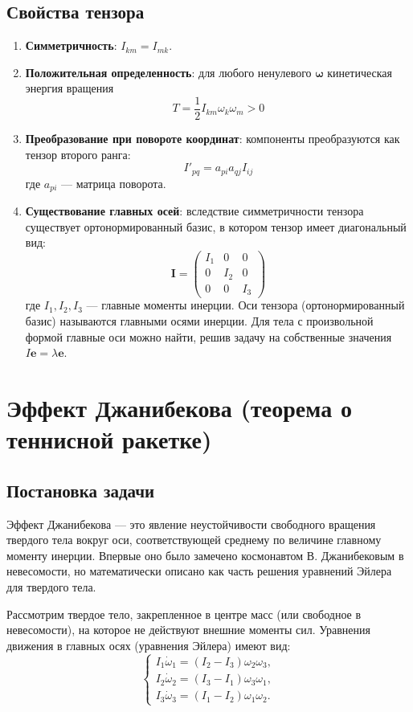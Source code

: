 \documentclass[12pt, a4paper]{article}
\begin{document}
\subsection{Свойства тензора}
\begin{enumerate}
    \item \textbf{Симметричность}: $I_{km} = I_{mk}$.
    \item \textbf{Положительная определенность}: для любого ненулевого $\boldsymbol{\omega}$ кинетическая энергия вращения 
    \[
    T = \frac{1}{2} I_{km} \omega_k \omega_m > 0
    \]
    \item \textbf{Преобразование при повороте координат}: компоненты преобразуются как тензор второго ранга:
    \[
    I'_{pq} = a_{pi} a_{qj} I_{ij}
    \]
    где $a_{pi}$ — матрица поворота.
    \item \textbf{Существование главных осей}: вследствие симметричности тензора существует ортонормированный базис, в котором тензор имеет диагональный вид:
    \[
    \mathbf{I} = \begin{pmatrix}
    I_1 & 0 & 0 \\
    0 & I_2 & 0 \\
    0 & 0 & I_3
    \end{pmatrix}
    \]
    где $I_1, I_2, I_3$ — главные моменты инерции. Оси тензора (ортонормированный базис) называются главными осями инерции. Для тела с произвольной формой главные оси можно найти, решив задачу на собственные значения $I \mathbf{e} = \lambda \mathbf{e}$.
\end{enumerate}

\section{Эффект Джанибекова (теорема о теннисной ракетке)}

\subsection{Постановка задачи}
Эффект Джанибекова — это явление неустойчивости свободного вращения твердого тела вокруг оси, соответствующей среднему по величине главному моменту инерции. Впервые оно было замечено космонавтом В. Джанибековым в невесомости, но математически описано как часть решения уравнений Эйлера для твердого тела.

Рассмотрим твердое тело, закрепленное в центре масс (или свободное в невесомости), на которое не действуют внешние моменты сил. Уравнения движения в главных осях (уравнения Эйлера) имеют вид:
\[
\begin{cases}
I_1 \dot{\omega}_1 = (I_2 - I_3) \omega_2 \omega_3, \\
I_2 \dot{\omega}_2 = (I_3 - I_1) \omega_3 \omega_1, \\
I_3 \dot{\omega}_3 = (I_1 - I_2) \omega_1 \omega_2.
\end{cases}
\]
\end{document}
